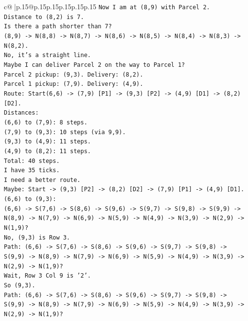 \documentclass{article}
\begin{document}
{\begin{supertabular}{c@{$\;$}|p{.15\linewidth}@{}p{.15\linewidth}p{.15\linewidth}p{.15\linewidth}p{.15\linewidth}p{.15\linewidth}}
{{{\texttt{Now I am at (8,9) with Parcel 2.} \\
\texttt{Distance to (8,2) is 7.} \\
\texttt{Is there a path shorter than 7?} \\
\texttt{(8,9) {-}> N(8,8) {-}> N(8,7) {-}> N(8,6) {-}> N(8,5) {-}> N(8,4) {-}> N(8,3) {-}> N(8,2).} \\
\texttt{No, it's a straight line.} \\
\texttt{Maybe I can deliver Parcel 2 on the way to Parcel 1?} \\
\texttt{Parcel 2 pickup: (9,3). Delivery: (8,2).} \\
\texttt{Parcel 1 pickup: (7,9). Delivery: (4,9).} \\
\texttt{Route: Start(6,6) {-}> (7,9) {[}P1{]} {-}> (9,3) {[}P2{]} {-}> (4,9) {[}D1{]} {-}> (8,2) {[}D2{]}.} \\
\texttt{Distances:} \\
\texttt{(6,6) to (7,9): 8 steps.} \\
\texttt{(7,9) to (9,3): 10 steps (via 9,9).} \\
\texttt{(9,3) to (4,9): 11 steps.} \\
\texttt{(4,9) to (8,2): 11 steps.} \\
\texttt{Total: 40 steps.} \\
\texttt{I have 35 ticks.} \\
\texttt{I need a better route.} \\
\texttt{Maybe: Start {-}> (9,3) {[}P2{]} {-}> (8,2) {[}D2{]} {-}> (7,9) {[}P1{]} {-}> (4,9) {[}D1{]}.} \\
\texttt{(6,6) to (9,3):} \\
\texttt{(6,6) {-}> S(7,6) {-}> S(8,6) {-}> S(9,6) {-}> S(9,7) {-}> S(9,8) {-}> S(9,9) {-}> N(8,9) {-}> N(7,9) {-}> N(6,9) {-}> N(5,9) {-}> N(4,9) {-}> N(3,9) {-}> N(2,9) {-}> N(1,9)?} \\
\texttt{No, (9,3) is Row 3.} \\
\texttt{Path: (6,6) {-}> S(7,6) {-}> S(8,6) {-}> S(9,6) {-}> S(9,7) {-}> S(9,8) {-}> S(9,9) {-}> N(8,9) {-}> N(7,9) {-}> N(6,9) {-}> N(5,9) {-}> N(4,9) {-}> N(3,9) {-}> N(2,9) {-}> N(1,9)?} \\
\texttt{Wait, Row 3 Col 9 is '2'.} \\
\texttt{So (9,3).} \\
\texttt{Path: (6,6) {-}> S(7,6) {-}> S(8,6) {-}> S(9,6) {-}> S(9,7) {-}> S(9,8) {-}> S(9,9) {-}> N(8,9) {-}> N(7,9) {-}> N(6,9) {-}> N(5,9) {-}> N(4,9) {-}> N(3,9) {-}> N(2,9) {-}> N(1,9)?} \\
}}}
\end{supertabular}}
\end{document}
